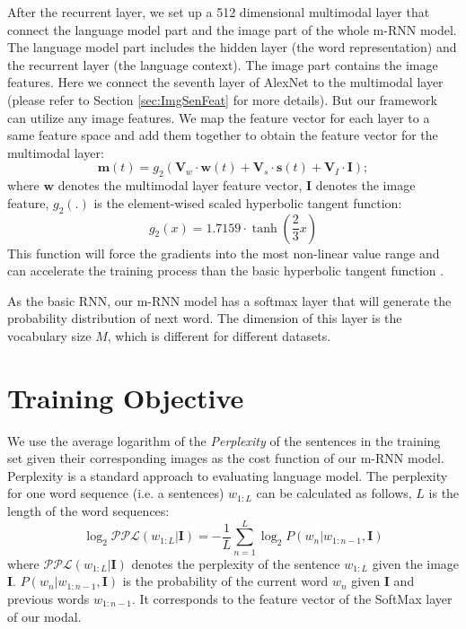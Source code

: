 After the recurrent layer, we set up a 512 dimensional multimodal layer that connect the language model part and the image part of the whole m-RNN model.
The language model part includes the hidden layer (the word representation) and the recurrent layer (the language context).
The image part contains the image features.
Here we connect the seventh layer of AlexNet \cite{krizhevsky2012imagenet} to the multimodal layer (please refer to Section \ref{sec:ImgSenFeat} for more details).
But our framework can utilize any image features.
We map the feature vector for each layer to a same feature space and add them together to obtain the feature vector for the multimodal layer:
\begin{equation}
\mathbf{m}(t)=g_2(\mathbf{V}_w \cdot \mathbf{w}(t) + \mathbf{V}_s \cdot \mathbf{s}(t) + \mathbf{V}_I \cdot \mathbf{I});
\end{equation}
where $\mathbf{w}$ denotes the multimodal layer feature vector, $\mathbf{I}$ denotes the image feature, $g_2(.)$ is the element-wised scaled hyperbolic tangent function:
\begin{equation}
g_2(x) = 1.7159 \cdot \tanh( \frac{2}{3} x)
\end{equation}
This function will force the gradients into the most non-linear value range and can accelerate the training process than the basic hyperbolic tangent function \cite{lecun2012efficient}.


As the basic RNN, our m-RNN model has a softmax layer that will generate the probability distribution of next word.
The dimension of this layer is the vocabulary size $M$, which is different for different datasets.

\section{Training Objective}
\label{sec:trainCost}
We use the average logarithm of the \emph{Perplexity} of the sentences in the training set given their corresponding images as the cost function of our m-RNN model.
Perplexity is a standard approach to evaluating language model.
The perplexity for one word sequence (i.e. a sentences) $w_{1:L}$ can be calculated as follows, $L$ is the length of the word sequences:
\begin{equation}
\log_2 \mathcal{PPL}(w_{1:L}|\mathbf{I}) = -\frac{1}{L} \sum_{n=1}^{L} \log_2 P(w_n|w_{1:n-1},\mathbf{I})
\end{equation}
where $\mathcal{PPL}(w_{1:L}|\mathbf{I})$ denotes the perplexity of the sentence $w_{1:L}$ given the image $\mathbf{I}$.
$P(w_n|w_{1:n-1},\mathbf{I})$ is the probability of the current word $w_n$ given $\mathbf{I}$ and previous words $w_{1:n-1}$.
It corresponds to the feature vector of the SoftMax layer of our modal.

